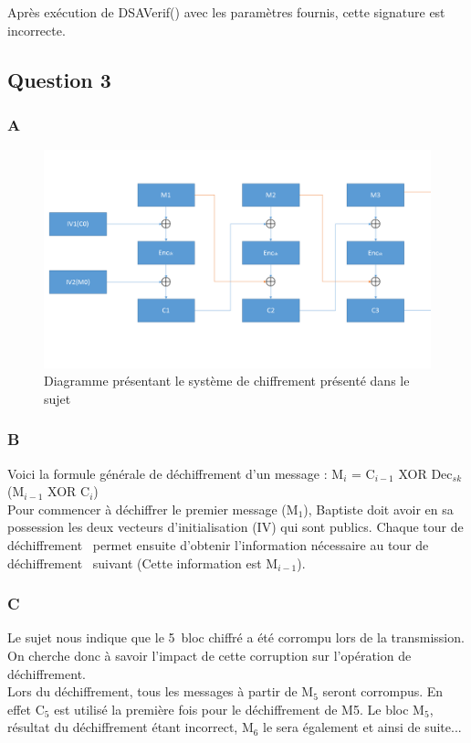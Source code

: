 \documentclass[a4paper, 11pt, oneside]{article}
\begin{document}
Après exécution de DSAVerif() avec les paramètres fournis, cette signature est incorrecte.

\newpage
\subsection{Question 3}

\subsubsection{A}

\begin{figure}[h!]
  \centering
  \includegraphics[width=\textwidth]{CBC.png}
  \caption{Diagramme présentant le système de chiffrement présenté dans le sujet}
\end{figure}

\subsubsection{B}

Voici la formule générale de déchiffrement d'un message : M$_{i}$ = C$_{i-1}$ XOR Dec$_{sk}$(M$_{i-1}$ XOR C$_{i}$)\\[5pt]
Pour commencer à déchiffrer le premier message (M$_{1}$), Baptiste doit avoir en sa possession les deux vecteurs d'initialisation (IV) qui sont publics. Chaque \og tour de déchiffrement \fg \ permet ensuite d'obtenir l'information nécessaire au \og tour de déchiffrement \fg \ suivant (Cette information est M$_{i-1}$).

\subsubsection{C}

Le sujet nous indique que le 5\ieme \ bloc chiffré a été corrompu lors de la transmission. On cherche donc à savoir l'impact de cette corruption sur l'opération de déchiffrement.\\
Lors du déchiffrement, tous les messages à partir de M$_{5}$ seront corrompus. En effet C$_{5}$ est utilisé la première fois pour le déchiffrement de M5. Le bloc M$_{5}$, résultat du déchiffrement étant incorrect, M$_{6}$ le sera également et ainsi de suite...
\end{document}
